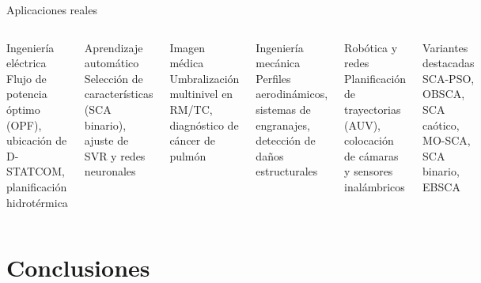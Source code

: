 \documentclass[aspectratio=169]{beamer}
\begin{document}
\begin{frame}{Aplicaciones reales}
  \begin{columns}[T]
      \begin{block}{Ingeniería eléctrica}
        Flujo de potencia óptimo (OPF), ubicación de D-STATCOM, planificación hidrotérmica
      \end{block}
      \vspace{0.3em}
      \begin{block}{Aprendizaje automático}
        Selección de características (SCA binario), ajuste de SVR y redes neuronales
      \end{block}
      \vspace{0.3em}
      \begin{block}{Imagen médica}
        Umbralización multinivel en RM/TC, diagnóstico de cáncer de pulmón
      \end{block}

      \begin{block}{Ingeniería mecánica}
        Perfiles aerodinámicos, sistemas de engranajes, detección de daños estructurales
      \end{block}
      \vspace{0.3em}
      \begin{block}{Robótica y redes}
        Planificación de trayectorias (AUV), colocación de cámaras y sensores inalámbricos
      \end{block}
      \vspace{0.3em}
      \begin{block}{Variantes destacadas}
        \small SCA-PSO, OBSCA, SCA caótico, MO-SCA, SCA binario, EBSCA
      \end{block}
  \end{columns}
\end{frame}

\section{Conclusiones}
\end{document}
